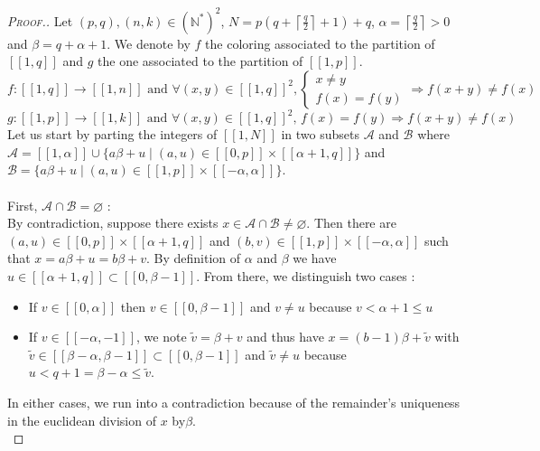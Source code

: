 \begin{proof}[\textsc{Proof.}]
Let \((p,q), (n,k) \in (\mathbb{N}^*)^2\), \(N = p(q+\left \lceil \displaystyle \frac{q}{2} \right \rceil + 1)+q\),
\(\alpha = \left \lceil \displaystyle \frac{q}{2} \right \rceil > 0\) and \(\beta = q + \alpha + 1\).
We denote by \(f\) the coloring associated to the partition of \([\![1,q]\!]\) and \(g\) the
one associated to the partition of \([\![1,p]\!]\).
\[ f : [\![1,q]\!] \longrightarrow [\![1,n]\!] \text{ and } \forall (x,y) \in [\![1,q]\!]^2, \left\{
\begin{array}{ll}
	x \neq y \\
	f(x) = f(y)
\end{array}
\right.
\Longrightarrow f(x+y) \neq f(x)
\]
\[g : [\![1,p]\!] \longrightarrow [\![1,k]\!] \text{ and } \forall (x,y) \in [\![1,q]\!]^2 \text{, } f(x) = f(y)
\Longrightarrow f(x+y) \neq f(x)
\]
Let us start by parting the integers of \([\![1,N]\!]\) in two subsets \(\mathcal{A}\) and \(\mathcal{B}\) where
\(\mathcal{A} = [\![1,\alpha]\!] \cup \{a\beta + u \mid (a,u) \in [\![0,p]\!] \times [\![\alpha + 1,q]\!]\}\) and
\(\mathcal{B} = \{a\beta + u \mid (a,u) \in [\![1,p]\!] \times [\![-\alpha,\alpha]\!]\}\).\\
\\
First, \underline{\(\mathcal{A} \cap \mathcal{B} = \varnothing\)} : \\
By contradiction, suppose there exists \(x \in \mathcal{A} \cap \mathcal{B} \neq \varnothing \). Then there are \((a,u)
\in [\![0,p]\!] \times [\![\alpha + 1,q]\!]\) and \((b,v) \in [\![1,p]\!] \times [\![-\alpha,\alpha]\!]\) such that \(x
= a\beta + u = b\beta +v\). By definition of \(\alpha\) and \(\beta\) we have \(u \in [\![\alpha + 1,q]\!] \subset
[\![0,\beta - 1]\!]\).
From there, we distinguish two cases :
\begin{itemize}
\item If \(v \in [\![0,\alpha]\!]\) then \(v \in [\![0,\beta - 1]\!]\) and \(v \neq u\) because \(v < \alpha + 1
\leqslant u\)
\item If \(v \in [\![-\alpha,-1]\!]\), we note \(\tilde{v} = \beta + v\) and thus have \(x = (b-1)\beta + \tilde{v}\)
with \(\tilde{v} \in [\![\beta - \alpha,\beta - 1]\!] \subset [\![0,\beta - 1]\!]\) and \(\tilde{v} \neq u\) because
\(u< q+1 = \beta - \alpha \leqslant \tilde{v}\).
\end{itemize}
In either cases, we run into a contradiction because of the remainder's uniqueness in the euclidean division of \(x\)
by\(\beta\).\\

\end{proof}
